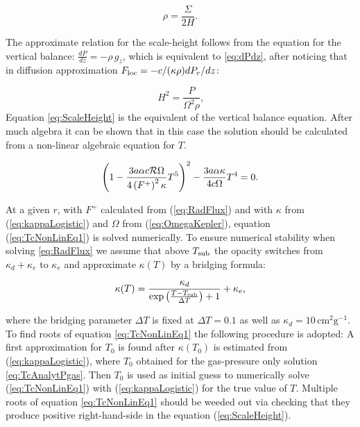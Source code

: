 \documentclass[12pt,english,preprint]{aastex}
\newcommand{\su}[2]{#1_{\rm #2}}
\newcommand{\Tc}{T}
\begin{document}
\begin{equation}
{\displaystyle \rho=\frac{\Sigma}{2H}}\label{eq:rhoEqSigmaOver2H}\mbox{.}
\end{equation}

\noindent The approximate relation for the scale-height follows from
the equation for the vertical balance:
$\displaystyle \frac{dP}{dz}=-\rho\,g_{z}$,
which is equivalent to \eqref{eq:dPdz}, after noticing that in diffusion approximation 
$\displaystyle \su{F}{loc}=-c/(\kappa\rho)dP_r/dz$:

  
\begin{equation}
{\displaystyle H^{2}=\frac{P}{\Omega^{2}\rho}\mbox{,}}\label{eq:ScaleHeight}
\end{equation}
Equation \eqref{eq:ScaleHeight} is the equivalent of the vertical balance equation.
After much algebra it can be shown that in this case the solution should be calculated from 
a non-linear algebraic equation for $\Tc$.

\begin{equation}
\left(1-\frac{3a\alpha c{\cal R}\Omega}{4\left(F^{+}\right)^{2}\kappa}
\Tc^{5}\right)^{2}-\frac{3a\alpha\kappa}{4c\Omega}\Tc^{4}=0\mbox{.}
\label{eq:TcNonLinEq1}
\end{equation}

At a given $r$, with $F^{+}$ calculated from (\ref{eq:RadFlux})
and with $\kappa$ from (\ref{eq:kappaLogistic}) and $\Omega$ from
(\ref{eq:OmegaKepler}), equation (\ref{eq:TcNonLinEq1}) is solved
numerically. 
To ensure numerical stability when solving \eqref{eq:RadFlux}
we assume that above $T_{{\rm sub}}$ the opacity switches from $\kappa_{d}+\kappa_{e}$ to
$\kappa_{e}$  and approximate $\kappa(T)$ by a bridging formula:

\begin{equation}
\kappa(T)=\frac{\kappa_d}
{\exp\left(
  \frac{T-\su{T}{sub}}{\Delta T}
  \right)+1} + \kappa_e
\mbox{,}
\label{eq:kappaLogistic}
\end{equation}


\noindent where the bridging parameter $\Delta T$ is fixed at $\Delta T=0.1$ as well as $\kappa_{d}=10\,\text{cm}^{2}\text{g}^{-1}$.
To find roots of equation \eqref{eq:TcNonLinEq1} the following
procedure is adopted:
A first approximation for $T_0$
is found after $\kappa(T_0)$ is estimated from (\ref{eq:kappaLogistic}), 
where $T_0$ obtained
for the gas-pressure only solution \eqref{eq:TcAnalytPgas}.
Then $T_0$ is used as initial guess to numerically 
solve (\ref{eq:TcNonLinEq1}) with (\ref{eq:kappaLogistic}) 
for the true value of $T$.
Multiple roots of equation \eqref{eq:TcNonLinEq1} should be weeded out via checking that
they produce positive right-hand-side in the equation (\ref{eq:ScaleHeight}).
\end{document}
